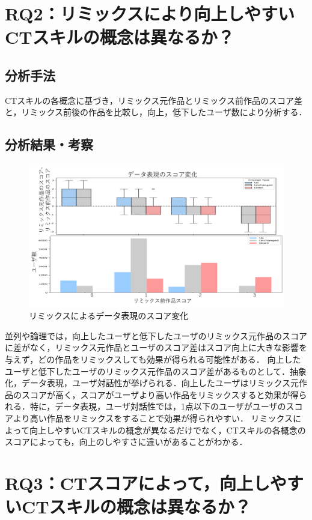 \documentclass[twocolumn]{jarticle} %
\begin{document}
\section{RQ2：リミックスにより向上しやすいCTスキルの概念は異なるか？}
\subsection{分析手法}
CTスキルの各概念に基づき，リミックス元作品とリミックス前作品のスコア差と，リミックス前後の作品を比較し，向上，低下したユーザ数により分析する．
\subsection{分析結果・考察}
\begin{figure}[h]
\centerline{\includegraphics[width=0.8\linewidth]{@BSthesis2024_Horio/BSthesis2024_Horio_fig/resume_rq2.pdf}}
\caption{リミックスによるデータ表現のスコア変化}
\label{fig:}
\end{figure}
並列や論理では，向上したユーザと低下したユーザのリミックス元作品のスコアに差がなく，リミックス元作品とユーザのスコア差はスコア向上に大きな影響を与えず，どの作品をリミックスしても効果が得られる可能性がある．
向上したユーザと低下したユーザのリミックス元作品のスコア差があるものとして．抽象化，データ表現，ユーザ対話性が挙げられる．向上したユーザはリミックス元作品のスコアが高く，スコアがユーザより高い作品をリミックスすると効果が得られる．特に，データ表現，ユーザ対話性では，1点以下のユーザがユーザのスコアより高い作品をリミックスをすることで効果が得られやすい．
リミックスによって向上しやすいCTスキルの概念が異なるだけでなく，CTスキルの各概念のスコアによっても，向上のしやすさに違いがあることがわかる．

\section{RQ3：CTスコアによって，向上しやすいCTスキルの概念は異なるか？}
\end{document}
